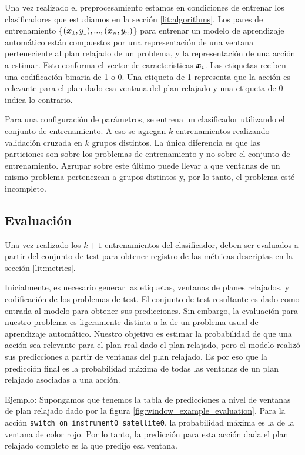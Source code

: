 Una vez realizado el preprocesamiento estamos en condiciones de entrenar los
clasificadores que estudiamos en la sección \ref{lit:algorithms}. Los pares de
entrenamiento \{$(\boldsymbol{x}_1, y_1), ..., (\boldsymbol{x}_n, y_n)$\} para entrenar un
modelo de aprendizaje automático están compuestos por una representación de una
ventana perteneciente al plan relajado de un problema, y la representación de
una acción a estimar. Esto conforma el vector de características $\boldsymbol{x}_i$.
Las etiquetas reciben una codificación binaria de 1 o 0. Una etiqueta de 1
representa que la acción es relevante para el plan dado esa ventana del plan
relajado y una etiqueta de 0 indica lo contrario.

Para una configuración de parámetros, se entrena un clasificador utilizando
el conjunto de entrenamiento. A eso se agregan $k$ entrenamientos realizando
validación cruzada en $k$ grupos distintos. La única diferencia es que las
particiones son sobre los problemas de entrenamiento y no sobre el conjunto de
entrenamiento. Agrupar sobre este último puede llevar a que ventanas de un mismo
problema pertenezcan a grupos distintos y, por lo tanto, el problema esté
incompleto.

\subsection{Evaluación}

Una vez realizado los $k + 1$ entrenamientos del clasificador, deben ser
evaluados a partir del conjunto de test para obtener registro de las métricas
descriptas en la sección \ref{lit:metrics}. 

Inicialmente, es necesario generar las etiquetas, ventanas de planes relajados, y
codificación de los problemas de test. El conjunto de test resultante es dado
como entrada al modelo para obtener sus predicciones. Sin embargo, la evaluación
para nuestro problema es ligeramente distinta a la de un problema usual de
aprendizaje automático. Nuestro objetivo es estimar la probabilidad de que una
acción sea relevante para el plan real dado el plan relajado, pero el modelo
realizó sus predicciones a partir de ventanas del plan relajado. Es por eso que
la predicción final es la probabilidad máxima de todas las ventanas de un plan
relajado asociadas a una acción.

Ejemplo: Supongamos que tenemos la tabla de predicciones a nivel de ventanas de
plan relajado dado por la figura \ref{fig:window_example_evaluation}. Para la acción
\verb|switch on instrument0 satellite0|, la probabilidad máxima es la de la
ventana de color rojo. Por lo tanto, la predicción para esta acción dada el plan
relajado completo es la que predijo esa ventana.

